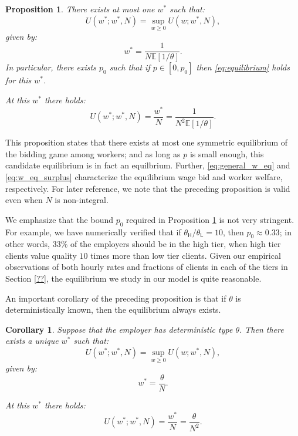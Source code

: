 \documentclass[11pt]{article}
\renewcommand{\H}{\ensuremath{\mathsf{H}}}
\renewcommand{\L}{\ensuremath{\mathsf{L}}}
\newcommand{\E}{\ensuremath{\mathbb{E}}}
\newtheorem{prop}{Proposition}
\newtheorem{corollary}{Corollary}
{\theoremstyle{definition}
\newtheorem{definition}{Definition}}
{\theoremstyle{remark}
\newtheorem{remark}{Remark}}
\begin{document}
\begin{prop}
\label{prop:general_eq}
There exists at most one $w^*$ such that:
\begin{equation}
\label{eq:equilibrium}
U(w^*; w^*, N) = \sup_{w \geq 0} U(w ; w^*, N),
\end{equation}
given by:
\begin{equation}
\label{eq:general_w_eq}
w^* = \frac{1}{N \E[1/\theta]}.
\end{equation}
In particular, there exists $p_0$ such that if $p \in [0,p_0]$ then \eqref{eq:equilibrium} holds for this $w^*$.

At this $w^*$ there holds:
\begin{equation}
\label{eq:w_eq_surplus}
U(w^* ; w^*, N) = \frac{w^*}{N} = \frac{1}{N^2 \E[1/\theta]}.
\end{equation}
\end{prop}

This proposition states that there exists at most one symmetric equilibrium of the bidding game among workers;
and as long as $p$ is small enough, this candidate equilibrium is in fact an equilbrium.
Further, \eqref{eq:general_w_eq} and \eqref{eq:w_eq_surplus} characterize the equilibrium wage bid and worker welfare, respectively.
For later reference, we note that the preceding proposition is valid even when $N$ is non-integral.

We emphasize that the bound $p_0$ required in Proposition \ref{prop:general_eq} is not very stringent.
For example, we have numerically verified that if $\theta_\H/\theta_\L = 10$, then $p_0 \approx 0.33$;
in other words, 33\% of the employers should be in the high tier, when high tier clients value quality $10$ times more than low tier clients.
Given our empirical observations of both hourly rates and fractions of clients in each of the tiers in Section \ref{??}, the equilibrium we study in our model is quite reasonable.


An important corollary of the preceding proposition is that if $\theta$ is deterministically known, then the equilibrium always exists.

\begin{corollary}
\label{cor:fixed_theta_eq}
Suppose that the employer has deterministic type $\theta$.
Then there exists a unique $w^*$ such that:
\begin{equation}
\label{eq:fixed_theta_equilibrium}
U(w^*; w^*, N) = \sup_{w \geq 0} U(w ; w^*, N),
\end{equation}
given by:
\begin{equation}
\label{eq:fixed_theta_w_eq}
w^* = \frac{\theta}{N}.
\end{equation}

At this $w^*$ there holds:
\begin{equation}
\label{eq:fixed_theta_w_eq_surplus}
U(w^* ; w^*, N) = \frac{w^*}{N} = \frac{\theta}{N^2}.
\end{equation}
\end{corollary}
\end{document}
